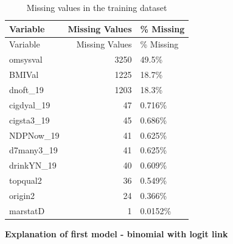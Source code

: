 \documentclass[
  11pt,
]{article}
\begin{document}
\begin{longtable}[]{@{}lrl@{}}
\caption{Missing values in the training dataset}\tabularnewline
\toprule\noalign{}
Variable & Missing Values & \% Missing \\
\midrule\noalign{}
\endfirsthead
\toprule\noalign{}
Variable & Missing Values & \% Missing \\
\midrule\noalign{}
\endhead
\bottomrule\noalign{}
\endlastfoot
omsysval & 3250 & 49.5\% \\
BMIVal & 1225 & 18.7\% \\
dnoft\_19 & 1203 & 18.3\% \\
cigdyal\_19 & 47 & 0.716\% \\
cigsta3\_19 & 45 & 0.686\% \\
NDPNow\_19 & 41 & 0.625\% \\
d7many3\_19 & 41 & 0.625\% \\
drinkYN\_19 & 40 & 0.609\% \\
topqual2 & 36 & 0.549\% \\
origin2 & 24 & 0.366\% \\
marstatD & 1 & 0.0152\% \\
\end{longtable}

\textbf{Explanation of first model - binomial with logit link}
\end{document}
